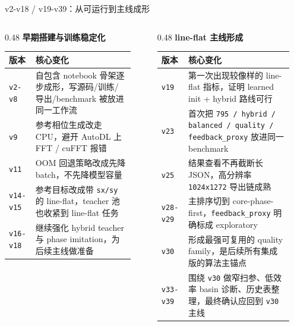 \documentclass[aspectratio=169,10pt]{ctexbeamer}
\begin{document}
\begin{frame}{v2-v18 / v19-v39：从可运行到主线成形}
  \begin{columns}[T]
    \begin{column}{0.48\textwidth}
      \scriptsize
      \textbf{早期搭建与训练稳定化}
      \begin{tabular}{>{\raggedright\arraybackslash}p{0.16\linewidth} >{\raggedright\arraybackslash}p{0.74\linewidth}}
        \toprule
        版本 & 核心变化 \\
        \midrule
        \texttt{v2-v8} & 自包含 notebook 骨架逐步成形，写源码/训练/导出/benchmark 被放进同一工作流 \\
        \texttt{v9} & 795 参考相位生成改走 CPU，避开 AutoDL 上 FFT / cuFFT 报错 \\
        \texttt{v11} & OOM 回退策略改成先降 batch，不先降模型容量 \\
        \texttt{v14-v15} & 参考目标改成带 \texttt{sx/sy} 的 line-flat，teacher 池也收紧到 line-flat 任务 \\
        \texttt{v16-v18} & 继续强化 hybrid teacher 与 phase imitation，为后续主线做准备 \\
        \bottomrule
      \end{tabular}
    \end{column}
    \begin{column}{0.48\textwidth}
      \scriptsize
      \textbf{line-flat 主线形成}
      \begin{tabular}{>{\raggedright\arraybackslash}p{0.16\linewidth} >{\raggedright\arraybackslash}p{0.74\linewidth}}
        \toprule
        版本 & 核心变化 \\
        \midrule
        \texttt{v19} & 第一次出现较像样的 line-flat 指标，证明 learned init + hybrid 路线可行 \\
        \texttt{v23} & 首次把 \texttt{795 / hybrid / balanced / quality / feedback\_proxy} 放进同一 benchmark \\
        \texttt{v25} & 结果查看不再截断长 JSON，高分辨率 \texttt{1024x1272} 导出链成熟 \\
        \texttt{v28-v29} & 主排序切到 core-phase-first，\texttt{feedback\_proxy} 明确标成 exploratory \\
        \texttt{v30} & 形成最强可复用的 quality family，是后续所有集成版的算法主锚点 \\
        \texttt{v33-v39} & 围绕 \texttt{v30} 做窄扫参、低效率 basin 诊断、历史表整理，最终确认应回到 \texttt{v30} 主线 \\
        \bottomrule
      \end{tabular}
    \end{column}
  \end{columns}
\end{frame}
\end{document}
